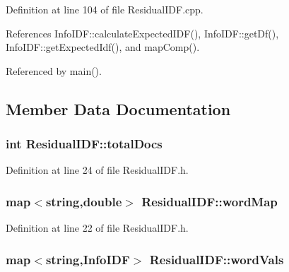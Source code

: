 \-Definition at line 104 of file \-Residual\-I\-D\-F.\-cpp.



\-References \-Info\-I\-D\-F\-::calculate\-Expected\-I\-D\-F(), \-Info\-I\-D\-F\-::get\-Df(), \-Info\-I\-D\-F\-::get\-Expected\-Idf(), and map\-Comp().



\-Referenced by main().



\subsection{\-Member \-Data \-Documentation}
\hypertarget{classResidualIDF_abf955a0231682be307c0c7eca6c52828}{
\subsubsection[{total\-Docs}]{\setlength{\rightskip}{0pt plus 5cm}int {\bf \-Residual\-I\-D\-F\-::total\-Docs}}}\label{classResidualIDF_abf955a0231682be307c0c7eca6c52828}


\-Definition at line 24 of file \-Residual\-I\-D\-F.\-h.

\hypertarget{classResidualIDF_a079156a1a77c0a5278399a55fb6e57bc}{
\subsubsection[{word\-Map}]{\setlength{\rightskip}{0pt plus 5cm}map$<$string,double$>$ {\bf \-Residual\-I\-D\-F\-::word\-Map}}}\label{classResidualIDF_a079156a1a77c0a5278399a55fb6e57bc}


\-Definition at line 22 of file \-Residual\-I\-D\-F.\-h.

\hypertarget{classResidualIDF_aeb4512a5c664c4163b1f35d98357e583}{
\subsubsection[{word\-Vals}]{\setlength{\rightskip}{0pt plus 5cm}map$<$string,{\bf \-Info\-I\-D\-F}$>$ {\bf \-Residual\-I\-D\-F\-::word\-Vals}}}\label{classResidualIDF_aeb4512a5c664c4163b1f35d98357e583}


